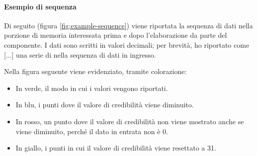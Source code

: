 \documentclass{article}
\begin{document}
\paragraph{Esempio di sequenza}
Di seguito (figura \ref{fig:example-sequence}) viene riportata la sequenza di dati nella porzione di memoria interessata prima e dopo l'elaborazione da parte del componente. I dati sono scritti in valori decimali; per brevità, ho riportato come [...] una serie di  nella sequenza di dati in ingresso.

Nella figura seguente viene evidenziato, tramite colorazione:
\begin{itemize}
    \item In verde, il modo in cui i valori vengono riportati.
    \item In blu, i punti dove il valore di credibilità viene diminuito.
    \item In rosso, un punto dove il valore di credibilità non viene mostrato anche se viene diminuito, perché il dato in entrata non è 0.
    \item In giallo, i punti in cui il valore di credibilità viene resettato a 31.
\end{itemize}

\end{document}
